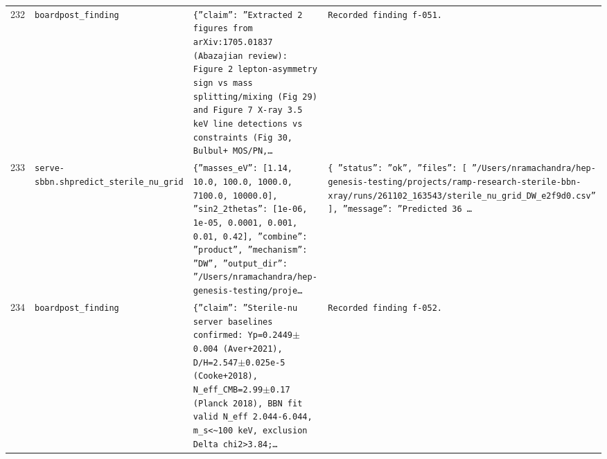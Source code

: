 \documentclass[11pt,a4paper]{article}
\begin{document}
\begin{longtable}{@{}p{}p{}p{}p{}@{}}
232 & \texttt{board}\newline\texttt{post\_\allowbreak{}finding} & \texttt{\{''claim'':\allowbreak{} ''Extracted 2 figures from arXiv:\allowbreak{}1705.01837 (Abazajian review)\allowbreak{}:\allowbreak{} Figure 2 lepton-asymmetry sign vs mass splitting/\allowbreak{}mixing (Fig 29)\allowbreak{} and Figure 7 X-ray 3.5 keV line detections vs constraints (Fig 30,\allowbreak{} Bulbul+ MOS/\allowbreak{}PN,\allowbreak{}\ldots{}\allowbreak{}} & \texttt{Recorded finding f-051.} \\
233 & \texttt{serve-sbbn.sh}\newline\texttt{predict\_\allowbreak{}sterile\_\allowbreak{}nu\_\allowbreak{}grid} & \texttt{\{''masses\_\allowbreak{}eV'':\allowbreak{} [1.14,\allowbreak{} 10.0,\allowbreak{} 100.0,\allowbreak{} 1000.0,\allowbreak{} 7100.0,\allowbreak{} 10000.0]\allowbreak{},\allowbreak{} ''sin2\_\allowbreak{}2thetas'':\allowbreak{} [1e-06,\allowbreak{} 1e-05,\allowbreak{} 0.0001,\allowbreak{} 0.001,\allowbreak{} 0.01,\allowbreak{} 0.42]\allowbreak{},\allowbreak{} ''combine'':\allowbreak{} ''product'',\allowbreak{} ''mechanism'':\allowbreak{} ''DW'',\allowbreak{} ''output\_\allowbreak{}dir'':\allowbreak{} ''/\allowbreak{}Users/\allowbreak{}nramachandra/\allowbreak{}hep-genesis-testing/\allowbreak{}proje\ldots{}\allowbreak{}} & \texttt{\{   ''status'':\allowbreak{} ''ok'',\allowbreak{}   ''files'':\allowbreak{} [     ''/\allowbreak{}Users/\allowbreak{}nramachandra/\allowbreak{}hep-genesis-testing/\allowbreak{}projects/\allowbreak{}ramp-research-sterile-bbn-xray/\allowbreak{}runs/\allowbreak{}261102\_\allowbreak{}163543/\allowbreak{}sterile\_\allowbreak{}nu\_\allowbreak{}grid\_\allowbreak{}DW\_\allowbreak{}e2f9d0.csv''   ]\allowbreak{},\allowbreak{}   ''message'':\allowbreak{} ''Predicted 36 \ldots{}\allowbreak{}} \\
234 & \texttt{board}\newline\texttt{post\_\allowbreak{}finding} & \texttt{\{''claim'':\allowbreak{} ''Sterile-nu server baselines confirmed:\allowbreak{} Yp=\allowbreak{}0.2449$\pm$0.004 (Aver+2021)\allowbreak{},\allowbreak{} D/\allowbreak{}H=\allowbreak{}2.547$\pm$0.025e-5 (Cooke+2018)\allowbreak{},\allowbreak{} N\_\allowbreak{}eff\_\allowbreak{}CMB=\allowbreak{}2.99$\pm$0.17 (Planck 2018)\allowbreak{},\allowbreak{} BBN fit valid N\_\allowbreak{}eff 2.044-6.044,\allowbreak{} m\_\allowbreak{}s\textless{}\allowbreak{}\textasciitilde{}\allowbreak{}100 keV,\allowbreak{} exclusion Delta chi2\textgreater{}\allowbreak{}3.84;\allowbreak{}\ldots{}\allowbreak{}} & \texttt{Recorded finding f-052.} \\

\end{longtable}
\end{document}
